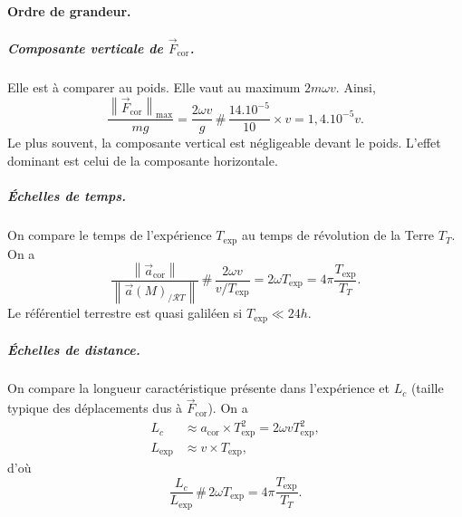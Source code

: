             \paragraph{Ordre de grandeur.}

                \subparagraph{Composante verticale de $\vec{F}_{\text{cor}}$.}

                    Elle est à comparer au poids. Elle vaut au maximum $2m\omega v$. Ainsi,
                    \begin{equation*}
                        \frac{\left\lVert\vec{F}_{\text{cor}}\right\rVert_{\text{max}}}{mg}=\frac{2\omega v}{g}\,\#\,\frac{14.10^{-5}}{10}\times v = 1,4.10^{-5}v.
                    \end{equation*}
                    Le plus souvent, la composante vertical est négligeable devant le poids. L'effet dominant est celui de la composante horizontale.

                \subparagraph{Échelles de temps.}

                    On compare le temps de l'expérience $T_{\text{exp}}$ au temps de révolution de la Terre $T_T$. On a 
                    \begin{equation*}
                        \frac{\left\lVert\vec{a}_{\text{cor}}\right\rVert}{\left\lVert\vec{a}(M)_{/\mathcal{R}T}\right\rVert}\,\#\,\frac{2\omega v}{v/T_{\text{exp}}}=2\omega T_{\text{exp}}=4\pi\frac{T_{\text{exp}}}{T_T}.
                    \end{equation*}
                    Le référentiel terrestre est quasi galiléen si $T_{\text{exp}}\ll 24h$.

                \subparagraph{Échelles de distance.}

                    On compare la longueur caractéristique présente dans l'expérience et $L_c$ (taille typique des déplacements dus à $\vec{F}_{\text{cor}}$). On a 
                    \begin{equation*}
                        \begin{aligned}
                            L_c & \approx a_{\text{cor}}\times T_{\text{exp}}^{2}=2\omega vT_{\text{exp}}^{2},\\
                            L_{\text{exp}} & \approx v\times T_{\text{exp}},
                        \end{aligned}
                    \end{equation*}
                    d'où 
                    \begin{equation*}
                        \frac{L_c}{L_{\text{exp}}}\,\#\,2\omega T_{\text{exp}}=4\pi\frac{T_{\text{exp}}}{T_T}.
                    \end{equation*}

